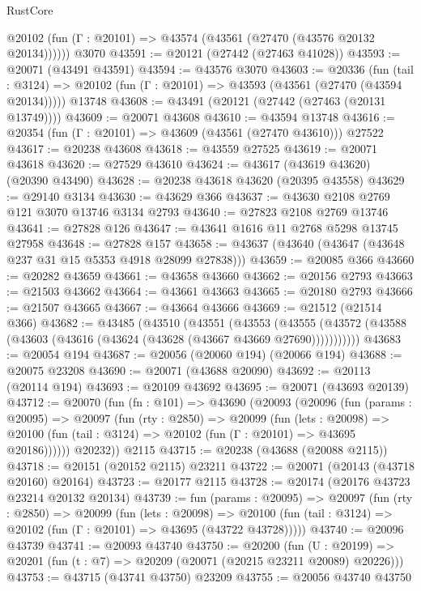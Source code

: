 \begin{lexlean}{RustCore}
\begin{coremodule}
      @20102 (fun (Γ : @20101) => @43574 (@43561 (@27470 (@43576 @20132 @20134))))))
    @3070
@43591 := @20121 (@27442 (@27463 @41028))
@43593 := @20071 (@43491 @43591)
@43594 := @43576 @3070
@43603 := @20336
    (fun (tail : @3124) => @20102 (fun (Γ : @20101) => @43593 (@43561 (@27470 (@43594 @20134)))))
    @13748
@43608 := @43491 (@20121 (@27442 (@27463 (@20131 @13749))))
@43609 := @20071 @43608
@43610 := @43594 @13748
@43616 := @20354 (fun (Γ : @20101) => @43609 (@43561 (@27470 @43610))) @27522
@43617 := @20238 @43608
@43618 := @43559 @27525
@43619 := @20071 @43618
@43620 := @27529 @43610
@43624 := @43617 (@43619 @43620) (@20390 @43490)
@43628 := @20238 @43618 @43620 (@20395 @43558)
@43629 := @29140 @3134
@43630 := @43629 @366
@43637 := @43630 @2108 @2769 @121 @3070 @13746 @3134 @2793
@43640 := @27823 @2108 @2769 @13746
@43641 := @27828 @126
@43647 := @43641 @1616 @11 @2768 @5298 @13745 @27958
@43648 := @27828 @157
@43658 := @43637 (@43640 (@43647 (@43648 @237 @31 @15 @5353 @4918 @28099 @27838)))
@43659 := @20085 @366
@43660 := @20282 @43659
@43661 := @43658 @43660
@43662 := @20156 @2793
@43663 := @21503 @43662
@43664 := @43661 @43663
@43665 := @20180 @2793
@43666 := @21507 @43665
@43667 := @43664 @43666
@43669 := @21512 (@21514 @366)
@43682 := @43485
    (@43510
      (@43551
        (@43553
          (@43555 (@43572 (@43588 (@43603 (@43616 (@43624 (@43628 (@43667 @43669 @27690)))))))))))
@43683 := @20054 @194
@43687 := @20056 (@20060 @194) (@20066 @194)
@43688 := @20075 @23208
@43690 := @20071 (@43688 @20090)
@43692 := @20113 (@20114 @194)
@43693 := @20109 @43692
@43695 := @20071 (@43693 @20139)
@43712 := @20070
    (fun (fn : @101) =>
    @43690
      (@20093
        (@20096
          (fun (params : @20095) =>
          @20097
            (fun (rty : @2850) =>
            @20099
              (fun (lets : @20098) =>
              @20100 (fun (tail : @3124) => @20102 (fun (Γ : @20101) => @43695 @20186))))))
        @20232))
    @2115
@43715 := @20238 (@43688 (@20088 @2115))
@43718 := @20151 (@20152 @2115) @23211
@43722 := @20071 (@20143 (@43718 @20160) @20164)
@43723 := @20177 @2115
@43728 := @20174 (@20176 @43723 @23214 @20132 @20134)
@43739 := fun (params : @20095) =>
  @20097
    (fun (rty : @2850) =>
    @20099
      (fun (lets : @20098) =>
      @20100 (fun (tail : @3124) => @20102 (fun (Γ : @20101) => @43695 (@43722 @43728)))))
@43740 := @20096 @43739
@43741 := @20093 @43740
@43750 := @20200
    (fun (U : @20199) => @20201 (fun (t : @7) => @20209 (@20071 (@20215 @23211 @20089) @20226)))
@43753 := @43715 (@43741 @43750) @23209
@43755 := @20056 @43740 @43750

\end{coremodule}
\end{lexlean}
